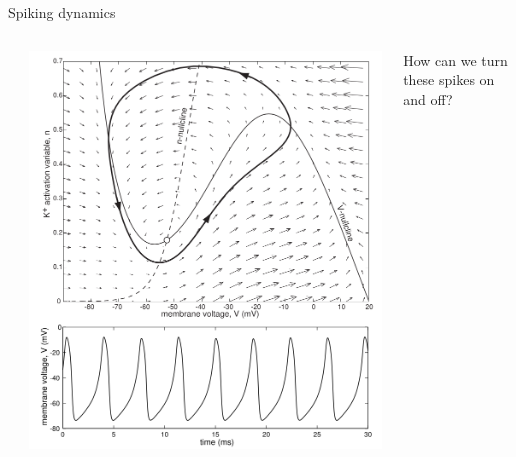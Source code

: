 \documentclass[presentation]{beamer}
\begin{document}
\begin{frame}[label={sec:org8b17aa8}]{Spiking dynamics}
\begin{columns}
\begin{column}{0.1\columnwidth}
\end{column}

\begin{column}{0.5\columnwidth}
\includegraphics[height=.85\textheight]{./phaseplane.png}
\end{column}

\begin{column}{0.4\columnwidth}
\vfill
How can we turn these spikes on and off?
\vfill
\end{column}
\end{columns}
\end{frame}
\end{document}
